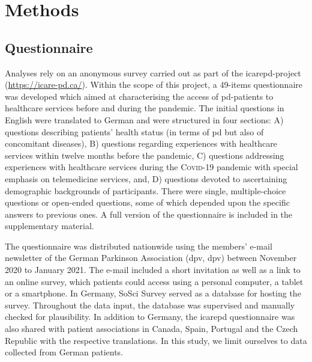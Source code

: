 \documentclass{bmcart}
\begin{document}
\section*{Methods}
\subsection*{Questionnaire}
Analyses rely on an anonymous survey carried out as part of the \ac{icarepd}-project (\url{https://icare-pd.ca/}). Within the scope of this project, a 49-items questionnaire was developed which aimed at characterising the access of \ac{pd}-patients to healthcare services before and during the pandemic. The initial questions in English were translated to German and were structured in four sections: A) questions describing patients' health status (in terms of \ac{pd} but also of concomitant diseases), B) questions regarding experiences with healthcare services within twelve months before the pandemic, C) questions addressing experiences with healthcare services during the \textsc{Covid}-19 pandemic with special emphasis on telemedicine services, and, D) questions devoted to ascertaining demographic backgrounds of participants. There were single, multiple-choice questions or open-ended questions, some of which depended upon the specific answers to previous ones. A full version of the questionnaire is included in the supplementary material. 

The questionnaire was distributed nationwide using the members’ e-mail newsletter of the German Parkinson Association (\acl{dpv}, \acs{dpv}) between November 2020 to January 2021. The e-mail included a short invitation as well as a link to an online survey, which patients could access using a personal computer, a tablet or a smartphone. In Germany, SoSci Survey \cite{leiner2016} served as a database for hosting the survey. Throughout the data input, the database was supervised and manually checked for plausibility. In addition to Germany, the \ac{icarepd} questionnaire was also shared with patient associations in Canada, Spain, Portugal and the Czech Republic with the respective translations. In this study, we limit ourselves to data collected from German patients. 
\end{document}
